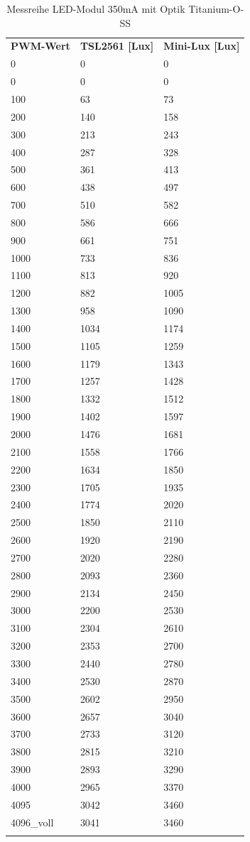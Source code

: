 \documentclass[a4paper,12pt]{scrartcl}
\begin{document}
\begin{longtable}{p{35mm}>{\columncolor[gray]{0.97}}p{35mm}p{35mm}}
  \rowcolor[gray]{.9}
    \textbf{PWM-Wert} & \textbf{TSL2561 [Lux]} & \textbf{Mini-Lux [Lux]} \\ 
0 & 0 & 0 \\
0	&	0	&	0	\\
100	&	63	&	73	\\
200	&	140	&	158	\\
300	&	213	&	243	\\
400	&	287	&	328	\\
500	&	361	&	413	\\
600	&	438	&	497	\\
700	&	510	&	582	\\
800	&	586	&	666	\\
900	&	661	&	751	\\
1000	&	733	&	836	\\
1100	&	813	&	920	\\
1200	&	882	&	1005	\\
1300	&	958	&	1090	\\
1400	&	1034	&	1174	\\
1500	&	1105	&	1259	\\
1600	&	1179	&	1343	\\
1700	&	1257	&	1428	\\
1800	&	1332	&	1512	\\
1900	&	1402	&	1597	\\
2000	&	1476	&	1681	\\
2100	&	1558	&	1766	\\
2200	&	1634	&	1850	\\
2300	&	1705	&	1935	\\
2400	&	1774	&	2020	\\
2500	&	1850	&	2110	\\
2600	&	1920	&	2190	\\
2700	&	2020	&	2280	\\
2800	&	2093	&	2360	\\
2900	&	2134	&	2450	\\
3000	&	2200	&	2530	\\
3100	&	2304	&	2610	\\
3200	&	2353	&	2700	\\
3300	&	2440	&	2780	\\
3400	&	2530	&	2870	\\
3500	&	2602	&	2950	\\
3600	&	2657	&	3040	\\
3700	&	2733	&	3120	\\
3800	&	2815	&	3210	\\
3900	&	2893	&	3290	\\
4000	&	2965	&	3370	\\
4095	&	3042	&	3460	\\
4096\_voll	&	3041	&	3460	\\
\caption{Messreihe LED-Modul 350mA mit Optik Titanium-O-SS}
\label{tab:350maTitSS}
\end{longtable}
\end{document}
